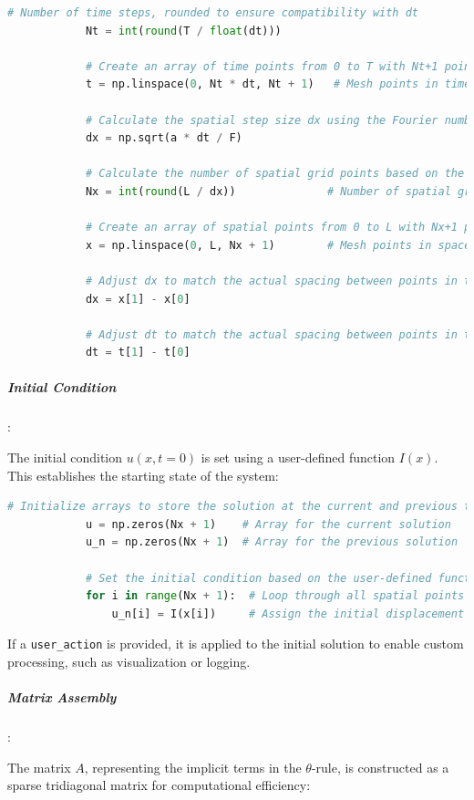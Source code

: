 \documentclass{article}
\begin{document}
			\begin{lstlisting}[language=Python]
			# Number of time steps, rounded to ensure compatibility with dt
			Nt = int(round(T / float(dt)))
				
			# Create an array of time points from 0 to T with Nt+1 points
			t = np.linspace(0, Nt * dt, Nt + 1)   # Mesh points in time
			
			# Calculate the spatial step size dx using the Fourier number F and dt
			dx = np.sqrt(a * dt / F)
			
			# Calculate the number of spatial grid points based on the domain length L and dx
			Nx = int(round(L / dx))              # Number of spatial grid points
				
			# Create an array of spatial points from 0 to L with Nx+1 points
			x = np.linspace(0, L, Nx + 1)        # Mesh points in space
				
			# Adjust dx to match the actual spacing between points in the x array
			dx = x[1] - x[0]
			
			# Adjust dt to match the actual spacing between points in the t array
			dt = t[1] - t[0]
			\end{lstlisting}
			
			
			\subparagraph{Initial Condition}:
			
			The initial condition \(u(x, t=0)\) is set using a user-defined function \(I(x)\). This establishes the starting state of the system:
			
			\begin{lstlisting}[language=Python]
			# Initialize arrays to store the solution at the current and previous time steps
			u = np.zeros(Nx + 1)    # Array for the current solution
			u_n = np.zeros(Nx + 1)  # Array for the previous solution
				
			# Set the initial condition based on the user-defined function I(x)
			for i in range(Nx + 1):  # Loop through all spatial points
				u_n[i] = I(x[i])     # Assign the initial displacement at each spatial point
			\end{lstlisting}
			
			
			If a \texttt{user\_action} is provided, it is applied to the initial solution to enable custom processing, such as visualization or logging.
			
			\subparagraph{Matrix Assembly}:
			
			The matrix \(A\), representing the implicit terms in the \(\theta\)-rule, is constructed as a sparse tridiagonal matrix for computational efficiency:
			
\end{document}

